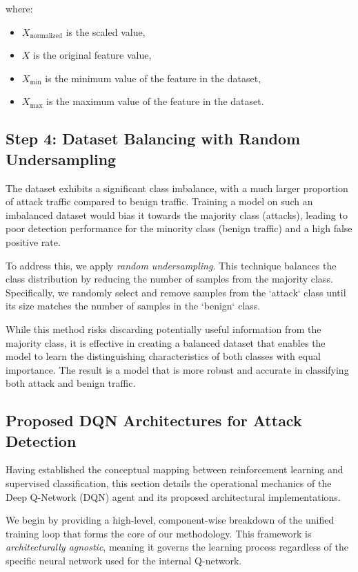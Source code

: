 \documentclass[12pt]{report}
\begin{document}
where:

\begin{itemize}
    \item \( X_{\text{normalized}} \) is the scaled value,
    \item \( X \) is the original feature value,
    \item \( X_{\min} \) is the minimum value of the feature in the dataset,
    \item \( X_{\max} \) is the maximum value of the feature in the dataset.
\end{itemize}

\subsection{Step 4: Dataset Balancing with Random Undersampling}

The dataset exhibits a significant class imbalance, with a much larger proportion of attack traffic compared to benign traffic. Training a model on such an imbalanced dataset would bias it towards the majority class (attacks), leading to poor detection performance for the minority class (benign traffic) and a high false positive rate.

To address this, we apply \textit{random undersampling}. This technique balances the class distribution by reducing the number of samples from the majority class. Specifically, we randomly select and remove samples from the `attack` class until its size matches the number of samples in the `benign` class.

While this method risks discarding potentially useful information from the majority class, it is effective in creating a balanced dataset that enables the model to learn the distinguishing characteristics of both classes with equal importance. The result is a model that is more robust and accurate in classifying both attack and benign traffic.

\subsection{Proposed DQN Architectures for Attack Detection}

Having established the conceptual mapping between reinforcement learning and supervised classification, this section details the operational mechanics of the Deep Q-Network (DQN) agent and its proposed architectural implementations.

We begin by providing a high-level, component-wise breakdown of the unified training loop that forms the core of our methodology. This framework is \textit{architecturally agnostic}, meaning it governs the learning process regardless of the specific neural network used for the internal Q-network.
\end{document}
